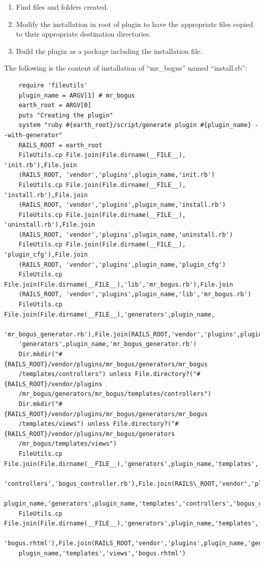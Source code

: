 \documentclass{article}
\begin{document}
\begin{enumerate}
    \item Find files and folders created.
    \item Modify the installation in root of plugin to have the appropriate files copied to their appropriate destination directories.
    \item Build the plugin as a package including the installation file.
\end{enumerate}

The following is the content of installation of ``mr\_bogus'' named ``install.rb'':

\begin{verbatim}
    require 'fileutils' 
    plugin_name = ARGV[1] # mr_bogus 
    earth_root = ARGV[0]  
    puts "Creating the plugin" 
    system "ruby #{earth_root}/script/generate plugin #{plugin_name} --with-generator" 
    RAILS_ROOT = earth_root 
    FileUtils.cp File.join(File.dirname(__FILE__), 'init.rb'),File.join
    (RAILS_ROOT, 'vendor','plugins',plugin_name,'init.rb')  
    FileUtils.cp File.join(File.dirname(__FILE__), 'install.rb'),File.join
    (RAILS_ROOT, 'vendor','plugins',plugin_name,'install.rb')  
    FileUtils.cp File.join(File.dirname(__FILE__), 'uninstall.rb'),File.join
    (RAILS_ROOT, 'vendor','plugins',plugin_name,'uninstall.rb')  
    FileUtils.cp File.join(File.dirname(__FILE__), 'plugin_cfg'),File.join
    (RAILS_ROOT, 'vendor','plugins',plugin_name,'plugin_cfg') 
    FileUtils.cp File.join(File.dirname(__FILE__),'lib','mr_bogus.rb'),File.join
    (RAILS_ROOT, 'vendor','plugins',plugin_name,'lib','mr_bogus.rb')  
    FileUtils.cp File.join(File.dirname(__FILE__),'generators',plugin_name,
    'mr_bogus_generator.rb'),File.join(RAILS_ROOT,'vendor','plugins',plugin_name,
    'generators',plugin_name,'mr_bogus_generator.rb')  
    Dir.mkdir("#{RAILS_ROOT}/vendor/plugins/mr_bogus/generators/mr_bogus
    /templates/controllers") unless File.directory?("#{RAILS_ROOT}/vendor/plugins
    /mr_bogus/generators/mr_bogus/templates/controllers") 
    Dir.mkdir("#{RAILS_ROOT}/vendor/plugins/mr_bogus/generators/mr_bogus
    /templates/views") unless File.directory?("#{RAILS_ROOT}/vendor/plugins/mr_bogus/generators
    /mr_bogus/templates/views") 
    FileUtils.cp File.join(File.dirname(__FILE__),'generators',plugin_name,'templates',
    'controllers','bogus_controller.rb'),File.join(RAILS\_ROOT,'vendor','plugins',
    plugin_name,'generators',plugin_name,'templates','controllers','bogus_controller.rb') 
    FileUtils.cp File.join(File.dirname(__FILE__),'generators',plugin_name,'templates','views',
    'bogus.rhtml'),File.join(RAILS_ROOT,'vendor','plugins',plugin_name,'generators',
    plugin_name,'templates','views','bogus.rhtml') 
\end{verbatim}
\end{document}

